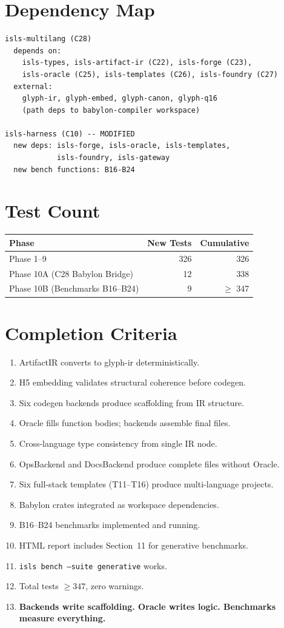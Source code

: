 \documentclass[11pt,a4paper,twoside]{article}
\theoremstyle{definition}
\theoremstyle{plain}
\theoremstyle{remark}
\begin{document}
\section{Dependency Map}

\begin{lstlisting}
isls-multilang (C28)
  depends on:
    isls-types, isls-artifact-ir (C22), isls-forge (C23),
    isls-oracle (C25), isls-templates (C26), isls-foundry (C27)
  external:
    glyph-ir, glyph-embed, glyph-canon, glyph-q16
    (path deps to babylon-compiler workspace)

isls-harness (C10) -- MODIFIED
  new deps: isls-forge, isls-oracle, isls-templates,
            isls-foundry, isls-gateway
  new bench functions: B16-B24
\end{lstlisting}


\section{Test Count}

\begin{tabular}{l r r}
\toprule
\textbf{Phase} & \textbf{New Tests} & \textbf{Cumulative} \\
\midrule
Phase 1--9 & 326 & 326 \\
Phase 10A (C28 Babylon Bridge) & 12 & 338 \\
Phase 10B (Benchmarks B16--B24) & 9 & $\ge$ 347 \\
\bottomrule
\end{tabular}


\section{Completion Criteria}

\begin{enumerate}[nosep]
  \item ArtifactIR converts to glyph-ir deterministically.
  \item H5 embedding validates structural coherence before codegen.
  \item Six codegen backends produce scaffolding from IR structure.
  \item Oracle fills function bodies; backends assemble final files.
  \item Cross-language type consistency from single IR node.
  \item OpsBackend and DocsBackend produce complete files without
        Oracle.
  \item Six full-stack templates (T11--T16) produce multi-language
        projects.
  \item Babylon crates integrated as workspace dependencies.
  \item B16--B24 benchmarks implemented and running.
  \item HTML report includes Section~11 for generative benchmarks.
  \item \texttt{isls bench --suite generative} works.
  \item Total tests $\ge 347$, zero warnings.
  \item \textbf{Backends write scaffolding. Oracle writes logic.
        Benchmarks measure everything.}
\end{enumerate}
\end{document}
